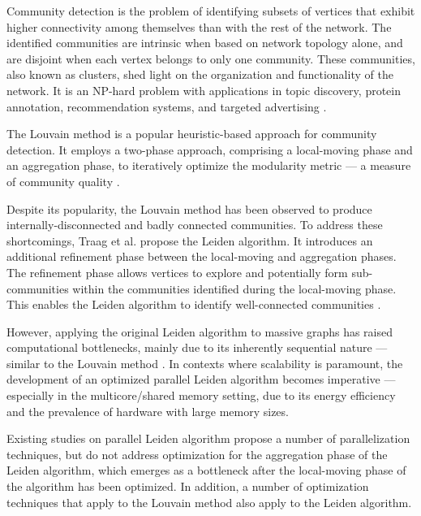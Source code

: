 Community detection is the problem of identifying subsets of vertices that exhibit higher connectivity among themselves than with the rest of the network. The identified communities are intrinsic when based on network topology alone, and are disjoint when each vertex belongs to only one community. These communities, also known as clusters, shed light on the organization and functionality of the network. It is an NP-hard problem with applications in topic discovery, protein annotation, recommendation systems, and targeted advertising \cite{com-gregory10}. The Louvain method \cite{com-blondel08} is a popular heuristic-based approach for community detection. It employs a two-phase approach, comprising a local-moving phase and an aggregation phase, to iteratively optimize the modularity metric --- a measure of community quality \cite{com-newman06}.

Despite its popularity, the Louvain method has been observed to produce internally-disconnected and badly connected communities. To address these shortcomings, Traag et al. \cite{com-traag19} propose the Leiden algorithm. It introduces an additional refinement phase between the local-moving and aggregation phases. The refinement phase allows vertices to explore and potentially form sub-communities within the communities identified during the local-moving phase. This enables the Leiden algorithm to identify well-connected communities \cite{com-traag19}.

However, applying the original Leiden algorithm to massive graphs has raised computational bottlenecks, mainly due to its inherently sequential nature --- similar to the Louvain method \cite{com-halappanavar17}. In contexts where scalability is paramount, the development of an optimized parallel Leiden algorithm becomes imperative --- especially in the multicore/shared memory setting, due to its energy efficiency and the prevalence of hardware with large memory sizes. Existing studies on parallel Leiden algorithm \cite{verweijfaster, nguyenleiden} propose a number of parallelization techniques, but do not address optimization for the aggregation phase of the Leiden algorithm, which emerges as a bottleneck after the local-moving phase of the algorithm has been optimized. In addition, a number of optimization techniques that apply to the Louvain method also apply to the Leiden algorithm.

